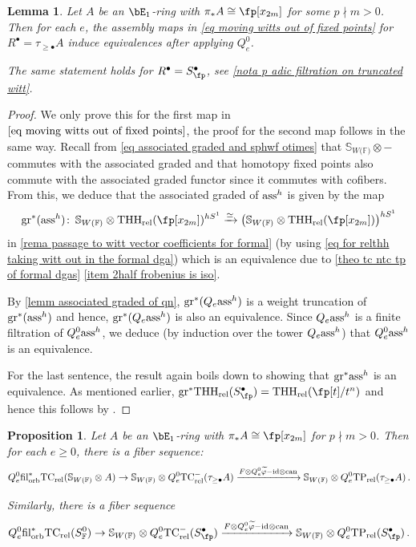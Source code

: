 \documentclass[english,10pt]{amsart}
\newcommand{\sphwf}{\mathbb{S}_{W(\mathbb{F)}}}
\newcommand{\rel}{\textup{rel}}
\newcommand{\field}{\mathbb{F}}
\newtheorem{prop}{Proposition}[section]
\newtheorem{lemm}{Lemma}[section]
\theoremstyle{definition}
\numberwithin{equation}{section}
\newcommand{\rntc}{\mathrm{TC}_{\rel}^{-}}
\newcommand{\rtp}{\mathrm{TP}_{\rel}}
\newcommand{\rtc}{\mathrm{TC}_{\rel}}
\newcommand{\rthh}{\mathrm{THH}_{\rel}}
\newcommand{\filorb}{\mathrm{fil}^{*}_{\textup{orb}}}
\newcommand{\wtw}{\tau_{\geq \bullet}}
\newcommand{\pis}{\pi_*}
\def\co{\colon\thinspace}
\newcommand{\gr}{\textup{gr}^*}
\begin{document}
\begin{lemm}\label{lemm moving witt out of fixed points}
Let $A$ be an $\bE_1$-ring with $\pis A\cong \fp[x_{2m}]$ for some $p\nmid m>0$. Then for each $e$, the assembly maps in \eqref{eq moving witts out of fixed points} for $R^{\bullet}=\tau_{\ge \bullet}A$ induce equivalences after applying $Q_e^0$. 

The same statement holds for  $R^\bullet = S_{\fp}^\bullet$, see \autoref{nota  p adic filtration on truncated witt}.
\end{lemm}

\begin{proof}
We only prove this for the first map in $\eqref{eq moving witts out of fixed points}$, the proof for the second map follows in the same way. Recall from \eqref{eq associated graded and sphwf otimes} that $\sphwf \otimes -$ commutes with the associated graded and that homotopy fixed points also commute with the associated graded functor since it commutes with cofibers. From this, we deduce that the associated graded of $\textup{ass}^h$ is given by the map 
\[\gr(\textup{ass}^h)\co \sphwf \otimes \rthh(\fp[x_{2m}])^{hS^1} \xrightarrow{\simeq} \big(\sphwf \otimes \rthh(\fp[x_{2m}]) \big)^{hS^1}\]
in \autoref{rema passage to witt vector coefficients for formal} (by using \eqref{eq for relthh taking witt out in the formal dga}) which is an equivalence due to \autoref{theo tc ntc tp of formal dgas} \eqref{item 2half frobenius is iso}. 

By \autoref{lemm associated graded of qn}, $\gr(Q_e \textup{ass}^h)$ is a weight truncation of $\gr(\textup{ass}^h)$ and hence, $\gr(Q_e \textup{ass}^h)$ is also an equivalence. Since $Q_e \textup{ass}^h$ is a finite filtration of $Q_e^0 \textup{ass}^h$, we deduce (by induction over the tower $Q_e \textup{ass}^h$) that $Q_e^0 \textup{ass}^h$ is an equivalence. 

For the last sentence, the result again boils down to showing that $\gr \textup{ass}^h$  is an equivalence. As mentioned earlier, $\gr \rthh(S_{\fp}^\bullet) = \rthh(\fp[t]/t^n)$ and hence this follows by \cite[Propositions 12 and 13]{speirs2020truncatedpolynomial}. 
\end{proof}

\begin{prop}\label{prop tc fiber sequence for the witt case}
Let $A$ be an $\bE_1$-ring with $\pis A\cong \fp[x_{2m}]$ for $p\nmid m >0$. Then for each $e\geq 0$, there is a fiber sequence:
\begin{equation}\label{Qn0tc}
Q_e^0 \filorb \rtc(\sphwf \otimes A) \to \sphwf \otimes Q_e^0\rntc(\wtw A) \xrightarrow{F \otimes Q_e^0 \widetilde{\varphi} - \textup{id} \otimes \textup{can}} \sphwf\otimes  Q_e^0 \rtp(\wtw A) \,.
\end{equation}

Similarly, there is a fiber sequence 
\begin{equation*}
Q_e^0 \filorb \rtc(S_{\field}^0) \to \sphwf \otimes Q_e^0\rntc(S_{\fp}^\bullet) \xrightarrow{F \otimes Q_e^0 \widetilde{\varphi} - \textup{id} \otimes \textup{can}} \sphwf\otimes  Q_e^0 \rtp(S_{\fp}^\bullet) \,.
\end{equation*}
\end{prop}
\end{document}
